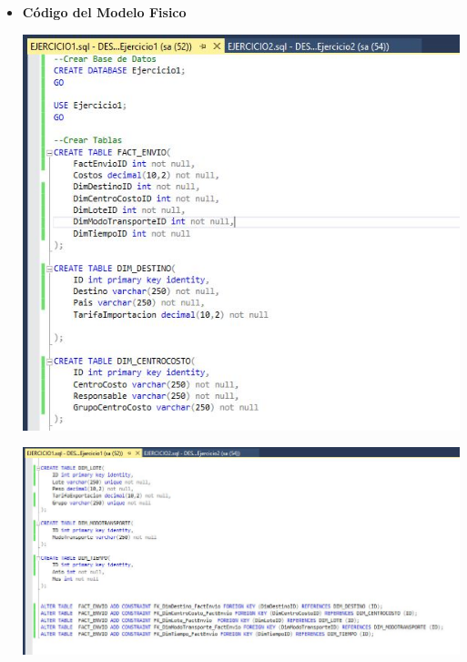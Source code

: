 \begin{itemize}
    \item \textbf{Código del Modelo Fisico}

	\begin{center}
	\includegraphics[width=17cm]{./Imagenes/Ejercicio1Fisico1}
	\end{center}	

	\begin{center}
	\includegraphics[width=17cm]{./Imagenes/Ejercicio1Fisico2}
	\end{center}	
\end{itemize}